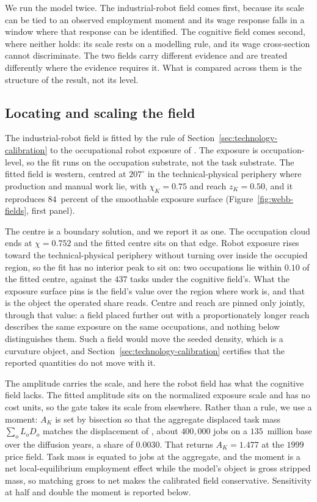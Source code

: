 \documentclass[12pt, a4paper]{article}
\begin{document}
We run the model twice. The industrial-robot field comes first, because
its scale can be tied to an observed employment moment and its wage
response falls in a window where that response can be identified. The
cognitive field comes second, where neither holds: its scale rests on a
modelling rule, and its wage cross-section cannot discriminate. The two
fields carry different evidence and are treated differently where the
evidence requires it. What is compared across them is the structure of
the result, not its level.

\subsection{Locating and scaling the field}
\label{sec:robot-field}

The industrial-robot field is fitted by the rule of
Section~\ref{sec:technology-calibration} to the occupational robot
exposure of \textcite{webb2020}. The exposure is occupation-level, so
the fit runs on the occupation substrate, not the task substrate.
The fitted field is western, centred at $207^\circ$ in the
technical-physical periphery where production and manual work lie, with
$\chi_K = 0.75$ and reach $z_K = 0.50$, and it reproduces $84$~percent
of the smoothable exposure surface (Figure~\ref{fig:webb-fields}, first
panel).

The centre is a boundary solution, and we report it as one. The
occupation cloud ends at $\chi = 0.752$ and the fitted centre sits on
that edge. Robot exposure rises toward the technical-physical periphery
without turning over inside the occupied region, so the fit has no
interior peak to sit on: two occupations lie within $0.10$ of the fitted
centre, against the $437$ tasks under the cognitive field's. What the
exposure surface pins is the field's value over the region where work
is, and that is the object the operated share reads. Centre and reach
are pinned only jointly, through that value: a field placed further out
with a proportionately longer reach describes the same exposure on the
same occupations, and nothing below distinguishes them. Such a field
would move the seeded density, which is a curvature object, and
Section~\ref{sec:technology-calibration} certifies that the reported
quantities do not move with it.

The amplitude carries the scale, and here the robot field has what the
cognitive field lacks. The fitted amplitude sits on the normalized
exposure scale and has no cost units, so the gate takes its scale from
elsewhere. Rather than a rule, we use a moment: $A_K$ is set by
bisection so that the aggregate displaced task mass $\sum_o L_o D_o$
matches the displacement of \textcite{acemoglu2020robots}, about
$400{,}000$ jobs on a $135$~million base over the diffusion years, a
share of $0.0030$. That returns $A_K = 1.477$ at the $1999$ price field.
Task mass is equated to jobs at the aggregate, and the moment is a net
local-equilibrium employment effect while the model's object is gross
stripped mass, so matching gross to net makes the calibrated field
conservative. Sensitivity at half and double the moment is reported
below.
\end{document}
